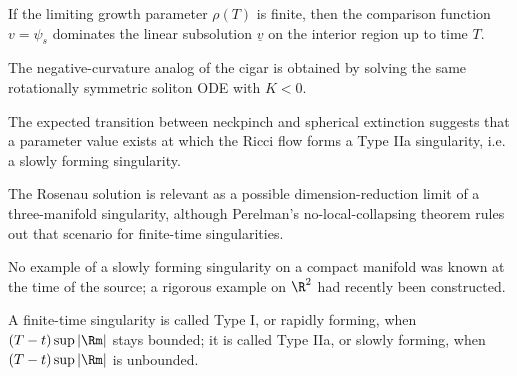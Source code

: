 \begin{lemma}
\label{ch02-lem-single-point-subsolution}

If the limiting growth parameter \(\rho(T)\) is finite, then the comparison
function \(v=\psi_s\) dominates the linear subsolution \(\underline v\) on the
interior region up to time \(T\).
\end{lemma}

\begin{remark}
\label{ch02-rem-cigar-negative-curvature-exercise}
The negative-curvature analog of the cigar is obtained by solving the same
rotationally symmetric soliton ODE with \(K<0\).
\end{remark}

\begin{remark}
\label{ch02-rem-degenerate-neckpinch-picture}
The expected transition between neckpinch and spherical extinction suggests
that a parameter value exists at which the Ricci flow forms a Type IIa
singularity, i.e. a slowly forming singularity.
\end{remark}

\begin{remark}
\label{ch02-rem-rosenau-singularity-model}
The Rosenau solution is relevant as a possible dimension-reduction limit of a
three-manifold singularity, although Perelman's no-local-collapsing theorem
rules out that scenario for finite-time singularities.
\end{remark}

\begin{remark}
\label{ch02-rem-slowly-forming-meaning}
No example of a slowly forming singularity on a compact manifold was known at
the time of the source; a rigorous example on \(\R^2\) had recently been
constructed.
\end{remark}

\begin{remark}
\label{ch02-rem-typei-typeiia}
A finite-time singularity is called Type I, or rapidly forming, when
\((T-t)\sup|\Rm|\) stays bounded; it is called Type IIa, or slowly forming, when
\((T-t)\sup|\Rm|\) is unbounded.
\end{remark}
